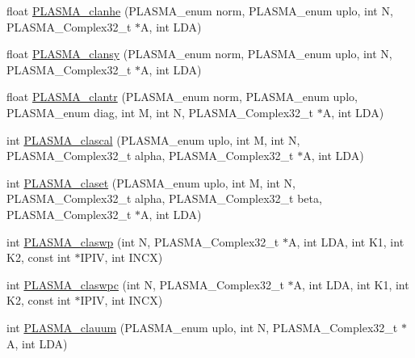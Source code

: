 \begin{DoxyCompactItemize}
\item 
float \hyperlink{group__PLASMA__Complex32__t_gad94d8c305fc09379f00422e5814c856c_gad94d8c305fc09379f00422e5814c856c}{P\+L\+A\+S\+M\+A\+\_\+clanhe} (P\+L\+A\+S\+M\+A\+\_\+enum norm, P\+L\+A\+S\+M\+A\+\_\+enum uplo, int N, P\+L\+A\+S\+M\+A\+\_\+\+Complex32\+\_\+t $\ast$A, int L\+D\+A)
\item 
float \hyperlink{group__PLASMA__Complex32__t_gafb115b9c58b142623cd960afcd17fa77_gafb115b9c58b142623cd960afcd17fa77}{P\+L\+A\+S\+M\+A\+\_\+clansy} (P\+L\+A\+S\+M\+A\+\_\+enum norm, P\+L\+A\+S\+M\+A\+\_\+enum uplo, int N, P\+L\+A\+S\+M\+A\+\_\+\+Complex32\+\_\+t $\ast$A, int L\+D\+A)
\item 
float \hyperlink{group__PLASMA__Complex32__t_gacec6cdd47e1d81482eecda3b20442572_gacec6cdd47e1d81482eecda3b20442572}{P\+L\+A\+S\+M\+A\+\_\+clantr} (P\+L\+A\+S\+M\+A\+\_\+enum norm, P\+L\+A\+S\+M\+A\+\_\+enum uplo, P\+L\+A\+S\+M\+A\+\_\+enum diag, int M, int N, P\+L\+A\+S\+M\+A\+\_\+\+Complex32\+\_\+t $\ast$A, int L\+D\+A)
\item 
int \hyperlink{group__PLASMA__Complex32__t_ga6a4e47bc770be8ab47852749032b39d0_ga6a4e47bc770be8ab47852749032b39d0}{P\+L\+A\+S\+M\+A\+\_\+clascal} (P\+L\+A\+S\+M\+A\+\_\+enum uplo, int M, int N, P\+L\+A\+S\+M\+A\+\_\+\+Complex32\+\_\+t alpha, P\+L\+A\+S\+M\+A\+\_\+\+Complex32\+\_\+t $\ast$A, int L\+D\+A)
\item 
int \hyperlink{group__PLASMA__Complex32__t_gabe5cbe444d3395d525dad261b92295f0_gabe5cbe444d3395d525dad261b92295f0}{P\+L\+A\+S\+M\+A\+\_\+claset} (P\+L\+A\+S\+M\+A\+\_\+enum uplo, int M, int N, P\+L\+A\+S\+M\+A\+\_\+\+Complex32\+\_\+t alpha, P\+L\+A\+S\+M\+A\+\_\+\+Complex32\+\_\+t beta, P\+L\+A\+S\+M\+A\+\_\+\+Complex32\+\_\+t $\ast$A, int L\+D\+A)
\item 
int \hyperlink{group__PLASMA__Complex32__t_ga2eefac923b3f9c1aa0233709c38a264d_ga2eefac923b3f9c1aa0233709c38a264d}{P\+L\+A\+S\+M\+A\+\_\+claswp} (int N, P\+L\+A\+S\+M\+A\+\_\+\+Complex32\+\_\+t $\ast$A, int L\+D\+A, int K1, int K2, const int $\ast$I\+P\+I\+V, int I\+N\+C\+X)
\item 
int \hyperlink{group__PLASMA__Complex32__t_gae22c29ff94608a4de968c347ec67f45b_gae22c29ff94608a4de968c347ec67f45b}{P\+L\+A\+S\+M\+A\+\_\+claswpc} (int N, P\+L\+A\+S\+M\+A\+\_\+\+Complex32\+\_\+t $\ast$A, int L\+D\+A, int K1, int K2, const int $\ast$I\+P\+I\+V, int I\+N\+C\+X)
\item 
int \hyperlink{group__PLASMA__Complex32__t_ga937589f5f8ae6b95a4e81589f5471d3e_ga937589f5f8ae6b95a4e81589f5471d3e}{P\+L\+A\+S\+M\+A\+\_\+clauum} (P\+L\+A\+S\+M\+A\+\_\+enum uplo, int N, P\+L\+A\+S\+M\+A\+\_\+\+Complex32\+\_\+t $\ast$A, int L\+D\+A)

\end{DoxyCompactItemize}
